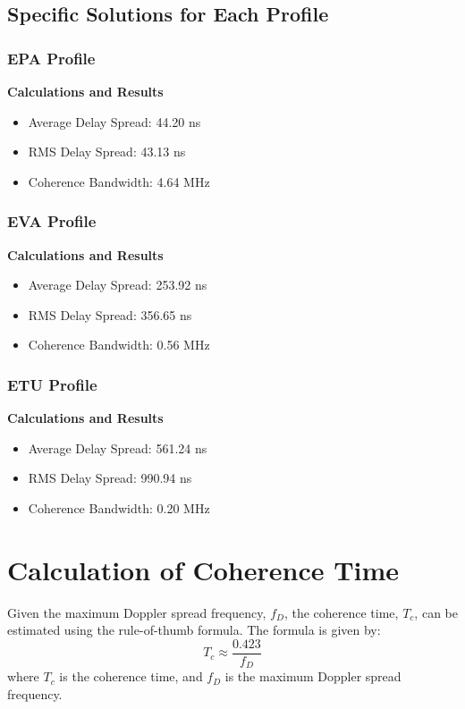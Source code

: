\documentclass{article}
\begin{document}
\clearpage
\subsection{Specific Solutions for Each Profile}
\subsubsection{EPA Profile}
\textbf{Calculations and Results}
\begin{itemize}
    \item Average Delay Spread: 44.20 ns
    \item RMS Delay Spread: 43.13 ns
    \item Coherence Bandwidth: 4.64 MHz
\end{itemize}

\subsubsection{EVA Profile}
\textbf{Calculations and Results}
\begin{itemize}
    \item Average Delay Spread: 253.92 ns
    \item RMS Delay Spread: 356.65 ns
    \item Coherence Bandwidth: 0.56 MHz
\end{itemize}

\subsubsection{ETU Profile}
\textbf{Calculations and Results}
\begin{itemize}
    \item Average Delay Spread: 561.24 ns
    \item RMS Delay Spread: 990.94 ns
    \item Coherence Bandwidth: 0.20 MHz
\end{itemize}

\clearpage
\section{Calculation of Coherence Time}
Given the maximum Doppler spread frequency, \( f_{D} \), the coherence time, \( T_{c} \), can be estimated using the rule-of-thumb formula. The formula is given by:
\[ T_{c} \approx \frac{0.423}{f_{D}} \]
where \( T_{c} \) is the coherence time, and \( f_{D} \) is the maximum Doppler spread frequency.
\end{document}

